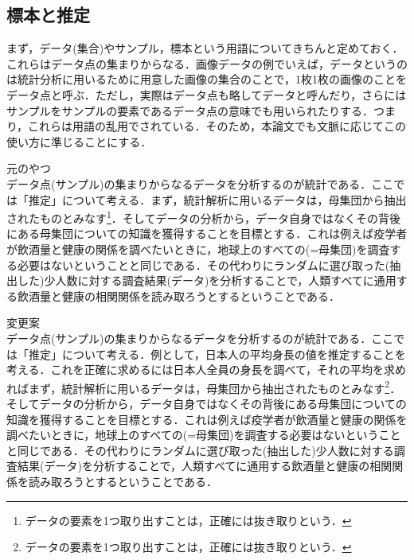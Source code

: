 \documentclass[a4paper,11pt]{jsreport}
\begin{document}
\subsection{標本と推定}
まず，データ(集合)やサンプル，標本という用語についてきちんと定めておく．これらはデータ点の集まりからなる．画像データの例でいえば，データというのは統計分析に用いるために用意した画像の集合のことで，1枚1枚の画像のことをデータ点と呼ぶ．ただし，実際はデータ点も略してデータと呼んだり，さらにはサンプルをサンプルの要素であるデータ点の意味でも用いられたりする．つまり，これらは用語の乱用でされている．そのため，本論文でも文脈に応じてこの使い方に準じることにする．\par
元のやつ\\
データ点(サンプル)の集まりからなるデータを分析するのが統計である．ここでは「推定」について考える．まず，統計解析に用いるデータは，母集団から抽出されたものとみなす\footnote{データの要素を1つ取り出すことは，正確には抜き取りという．}．そしてデータの分析から，データ自身ではなくその背後にある母集団についての知識を獲得することを目標とする．これは例えば疫学者が飲酒量と健康の関係を調べたいときに，地球上のすべての(=母集団)を調査する必要はないということと同じである．その代わりにランダムに選び取った(抽出した)少人数に対する調査結果(データ)を分析することで，人類すべてに通用する飲酒量と健康の相関関係を読み取ろうとするということである．\par
変更案\\
データ点(サンプル)の集まりからなるデータを分析するのが統計である．ここでは「推定」について考える．例として，日本人の平均身長の値を推定することを考える．これを正確に求めるには日本人全員の身長を調べて，それの平均を求めればまず，統計解析に用いるデータは，母集団から抽出されたものとみなす\footnote{データの要素を1つ取り出すことは，正確には抜き取りという．}．そしてデータの分析から，データ自身ではなくその背後にある母集団についての知識を獲得することを目標とする．これは例えば疫学者が飲酒量と健康の関係を調べたいときに，地球上のすべての(=母集団)を調査する必要はないということと同じである．その代わりにランダムに選び取った(抽出した)少人数に対する調査結果(データ)を分析することで，人類すべてに通用する飲酒量と健康の相関関係を読み取ろうとするということである．\par
\end{document}
